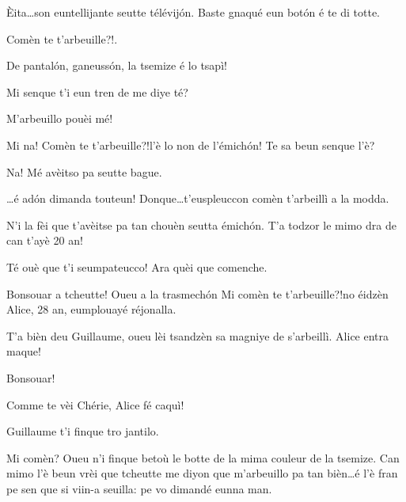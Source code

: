 \begin{drama}
\Vioupspeaks \`Eita\ldots son euntellijante seutte télévij\'on. Baste gnaqué eun bot\'on é te di totte.


\Vioupspeaks \og Comèn te t'arbeuille?!\fg.

\Vioujspeaks{} De pantal\'on, ganeuss\'on, la tsemize é lo tsapì!

\Vioupspeaks Mi senque t'i eun tren de me diye té?

\Vioujspeaks M'arbeuillo pouèi mé!

\Vioupspeaks Mi na! \og Comèn te t’arbeuille?!\fg l’è lo non de l'émich\'on! Te sa beun senque l'è?

\Vioujspeaks Na! Mé avèitso pa seutte bague.

\Vioupspeaks \ldots é ad\'on dimanda touteun! Donque\ldots t'euspleuccon comèn t'arbeillì a la modda.

\Vioujspeaks N'i la fèi que t'avèitse pa tan chouèn seutta émich\'on. T'a todzor le mimo dra de can t'ayè 20 an!

\Vioupspeaks{} Té ouè que t'i seumpateucco! Ara quèi que comenche.





\Guillaumespeaks Bonsouar a tcheutte! Oueu a la trasmech\'on \og Mi comèn te t'arbeuille?!\fg no éidzèn Alice, 28 an, eumplouayé réjonalla.

\Cheriespeaks T'a bièn deu Guillaume, oueu lèi tsandzèn sa magniye de s’arbeillì. Alice entra maque!


\Alicespeaks Bonsouar!


\Guillaumespeaks Comme te vèi Chérie, Alice fé caquì!

\Cheriespeaks Guillaume t’i finque tro jantilo. 

\Alicespeaks Mi comèn? Oueu n'i finque betoù le botte de la mima couleur de la tsemize. Can mimo l'è beun vrèi que tcheutte me diyon que m'arbeuillo pa tan bièn\ldots é l'è fran pe sen que si viin-a seuilla: pe vo dimandé eunna man.


\end{drama}
